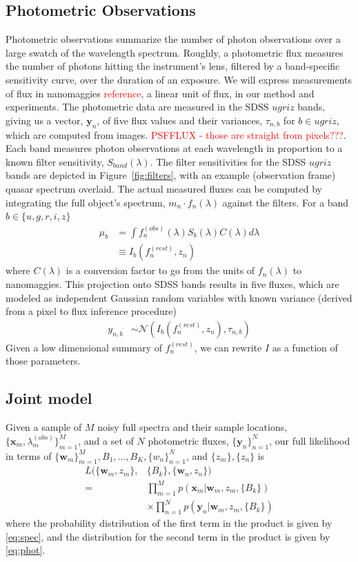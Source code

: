 \documentclass{article}
\newcommand{\red}[1]{\textcolor{red}{#1}}
\begin{document}
\subsection{Photometric Observations}
Photometric observations summarize the number of photon observations over a large swatch of the wavelength spectrum.  Roughly, a photometric flux measures the number of photons hitting the instrument's lens, filtered by a band-specific sensitivity curve, over the duration of an exposure. 
We will express measurements of flux in nanomaggies \red{reference}, a linear unit of flux, in our method and experiments.  
The photometric data are measured in the SDSS $ugriz$ bands, giving us a vector, $\mathbf{y}_n$, of five flux values and their variances, $\tau_{n, b}$ for $b \in ugriz$, which are computed from images. \red{PSFFLUX - those are straight from pixels???}.  
Each band measures photon observations at each wavelength in proportion to a known filter sensitivity, $S_{band}(\lambda)$. 
The filter sensitivities for the SDSS $ugriz$ bands are depicted in Figure~\ref{fig:filters}, with an example (observation frame) quasar spectrum overlaid.   The actual measured fluxes can be computed by integrating the full object's spectrum, $m_n \cdot f_n(\lambda)$ against the filters.  For a band $b \in \{u, g, r, i, z \}$
\begin{align}
  \mu_b &= \int f^{(obs)}_n(\lambda) S_b(\lambda) C(\lambda) d \lambda  \\
        &\equiv I_b(f_n^{(rest)}, z_n)
\end{align}
where $C(\lambda)$ is a conversion factor to go from the units of $f_n(\lambda)$ to nanomaggies.  This projection onto SDSS bands results in five fluxes, which are modeled as independent Gaussian random variables with known variance (derived from a pixel to flux inference procedure)
\begin{align}
  y_{n,b} &\sim \mathcal{N}( I_b(f_n^{(rest)}, z_n), \tau_{n,b} )
  \label{eq:phot}
\end{align}
Given a low dimensional summary of $f_n^{(rest)}$, we can rewrite $I$ as a function of those parameters. 

\subsection{Joint model}
Given a sample of $M$ noisy full spectra and their sample locations, $\{\mathbf{x}_m, \lambda^{(obs)}_m \}_{m=1}^M$, and a set of $N$ photometric fluxes, $\{\mathbf{y}_n\}_{n=1}^N$, our full likelihood in terms of $\{ \mathbf{w}_m \}_{m=1}^M, B_1, \dots, B_K, \{ w_n \}_{n=1}^N$, and $\{z_m\}, \{z_n\}$ is 
\begin{align*}
  L( \{ \mathbf{w}_m, z_m \}, &\{ B_k \}, \{ \mathbf{w}_n, z_n \} )  \\
    = & \prod_{m=1}^M p( \mathbf{x}_m | \mathbf{w}_m, z_m, \{ B_k \})  \\
      & \times \prod_{n=1}^N p( \mathbf{y}_n | \mathbf{w}_m, z_m, \{ B_k \})
\end{align*}
where the probability distribution of the first term in the product is given by \ref{eq:spec}, and the distribution for the second term in the product is given by \ref{eq:phot}.  
\end{document}
